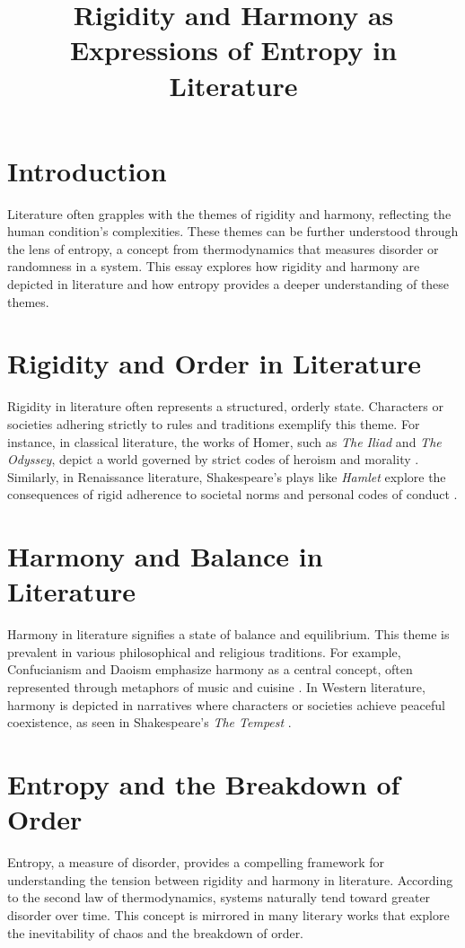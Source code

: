 \documentclass{article}
\title{Rigidity and Harmony as Expressions of Entropy in Literature}
\author{}
\date{}
\begin{document}
\maketitle

\section{Introduction}
Literature often grapples with the themes of rigidity and harmony, reflecting 
the human condition's complexities. These themes can be further understood 
through the lens of entropy, a concept from thermodynamics that measures 
disorder or randomness in a system. This essay explores how rigidity and 
harmony are depicted in literature and how entropy provides a deeper 
understanding of these themes.

\section{Rigidity and Order in Literature}
Rigidity in literature often represents a structured, orderly state. 
Characters or societies adhering strictly to rules and traditions exemplify 
this theme. For instance, in classical literature, the works of Homer, such as 
\textit{The Iliad} and \textit{The Odyssey}, depict a world governed by strict 
codes of heroism and morality \cite{homer}. Similarly, in Renaissance 
literature, Shakespeare's plays like \textit{Hamlet} explore the consequences 
of rigid adherence to societal norms and personal codes of 
conduct \cite{shakespeare}.

\section{Harmony and Balance in Literature}
Harmony in literature signifies a state of balance and equilibrium. This 
theme is prevalent in various philosophical and religious traditions. For 
example, Confucianism and Daoism emphasize harmony as a central concept, often 
represented through metaphors of music and cuisine \cite{li}. In Western 
literature, harmony is depicted in narratives where characters or societies 
achieve peaceful coexistence, as seen in 
Shakespeare's \textit{The Tempest} \cite{shakespeare}.

\section{Entropy and the Breakdown of Order}
Entropy, a measure of disorder, provides a compelling framework for 
understanding the tension between rigidity and harmony in literature. 
According to the second law of thermodynamics, systems naturally tend toward 
greater disorder over time. This concept is mirrored in many literary works 
that explore the inevitability of chaos and the breakdown of order.
\end{document}
